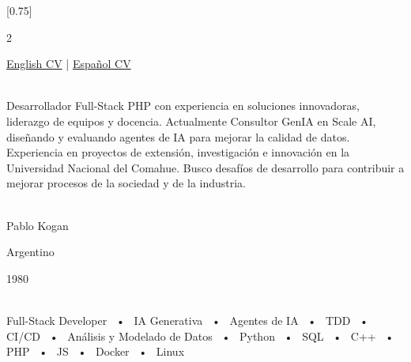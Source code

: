 \documentclass[lighthipster]{simplehipstercv}
\begin{document}
\setlength{\columnsep}{1.5cm}
[0.75]
\begin{paracol}{2}

\paracolbackgroundoptions

\footnotesize
\begin{center}
\href{https://pkogan.github.io/CV/pk202608en.pdf}{English CV}  |    
\href{https://pkogan.github.io/CV/pk202608es.pdf}{Español CV}    
\end{center}

\footnotesize
{\setasidefontcolour
\flushright
\begin{center}
\end{center}

\\[0.5em]

{\footnotesize
Desarrollador Full-Stack PHP con experiencia en soluciones innovadoras, liderazgo de equipos y docencia. Actualmente Consultor GenIA en Scale AI, diseñando y evaluando agentes de IA para mejorar la calidad de datos. Experiencia en proyectos de extensión, investigación e innovación en la Universidad Nacional del Comahue. Busco desafíos de desarrollo para contribuir a mejorar procesos de la sociedad y de la industria.
}
\bigskip

 \\[0.5em]
Pablo Kogan

Argentino

1980

\bigskip

 \\[0.5em]

Full-Stack Developer ~•~ IA Generativa ~•~ Agentes de IA ~•~ TDD ~•~ CI/CD ~•~ Análisis y Modelado de Datos ~•~ Python ~•~ SQL ~•~ C++ ~•~ PHP ~•~ JS  ~•~ Docker ~•~ Linux

\bigskip



}
\end{paracol}
\end{document}

